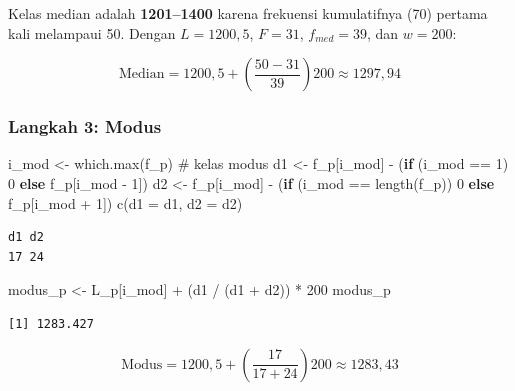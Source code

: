 \documentclass[
  indonesian,
  letterpaper,
]{book}
\newenvironment{Shaded}{\begin{snugshade}}{\end{snugshade}}
\newcommand{\AttributeTok}[1]{\textcolor[rgb]{0.40,0.45,0.13}{#1}}
\newcommand{\CommentTok}[1]{\textcolor[rgb]{0.37,0.37,0.37}{#1}}
\newcommand{\ControlFlowTok}[1]{\textcolor[rgb]{0.00,0.23,0.31}{\textbf{#1}}}
\newcommand{\DecValTok}[1]{\textcolor[rgb]{0.68,0.00,0.00}{#1}}
\newcommand{\FunctionTok}[1]{\textcolor[rgb]{0.28,0.35,0.67}{#1}}
\newcommand{\NormalTok}[1]{\textcolor[rgb]{0.00,0.23,0.31}{#1}}
\newcommand{\OtherTok}[1]{\textcolor[rgb]{0.00,0.23,0.31}{#1}}
\newcommand{\SpecialCharTok}[1]{\textcolor[rgb]{0.37,0.37,0.37}{#1}}
\begin{document}
Kelas median adalah \textbf{1201--1400} karena frekuensi kumulatifnya
(70) pertama kali melampaui 50. Dengan \(L = 1200{,}5\), \(F = 31\),
\(f_{med} = 39\), dan \(w = 200\):

\[\text{Median} = 1200{,}5 + \left(\frac{50 - 31}{39}\right) 200 \approx 1297{,}94\]

\subsubsection{Langkah 3: Modus}\label{langkah-3-modus}

\begin{Shaded}
\begin{Highlighting}[]
\NormalTok{i\_mod }\OtherTok{\textless{}{-}} \FunctionTok{which.max}\NormalTok{(f\_p)    }\CommentTok{\# kelas modus}
\NormalTok{d1 }\OtherTok{\textless{}{-}}\NormalTok{ f\_p[i\_mod] }\SpecialCharTok{{-}}\NormalTok{ (}\ControlFlowTok{if}\NormalTok{ (i\_mod }\SpecialCharTok{==} \DecValTok{1}\NormalTok{) }\DecValTok{0} \ControlFlowTok{else}\NormalTok{ f\_p[i\_mod }\SpecialCharTok{{-}} \DecValTok{1}\NormalTok{])}
\NormalTok{d2 }\OtherTok{\textless{}{-}}\NormalTok{ f\_p[i\_mod] }\SpecialCharTok{{-}}\NormalTok{ (}\ControlFlowTok{if}\NormalTok{ (i\_mod }\SpecialCharTok{==} \FunctionTok{length}\NormalTok{(f\_p)) }\DecValTok{0} \ControlFlowTok{else}\NormalTok{ f\_p[i\_mod }\SpecialCharTok{+} \DecValTok{1}\NormalTok{])}
\FunctionTok{c}\NormalTok{(}\AttributeTok{d1 =}\NormalTok{ d1, }\AttributeTok{d2 =}\NormalTok{ d2)}
\end{Highlighting}
\end{Shaded}

\begin{verbatim}
d1 d2 
17 24 
\end{verbatim}

\begin{Shaded}
\begin{Highlighting}[]
\NormalTok{modus\_p }\OtherTok{\textless{}{-}}\NormalTok{ L\_p[i\_mod] }\SpecialCharTok{+}\NormalTok{ (d1 }\SpecialCharTok{/}\NormalTok{ (d1 }\SpecialCharTok{+}\NormalTok{ d2)) }\SpecialCharTok{*} \DecValTok{200}
\NormalTok{modus\_p}
\end{Highlighting}
\end{Shaded}

\begin{verbatim}
[1] 1283.427
\end{verbatim}

\[\text{Modus} = 1200{,}5 + \left(\frac{17}{17 + 24}\right) 200 \approx 1283{,}43\]
\end{document}
